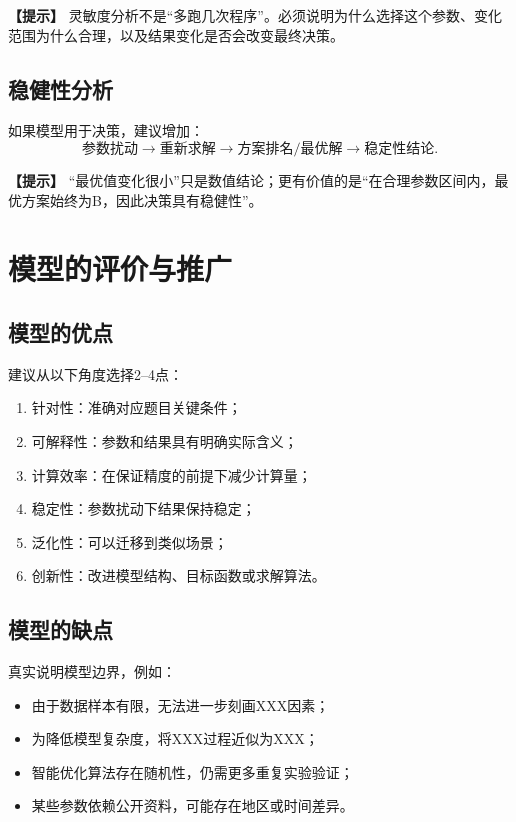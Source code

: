 \documentclass[12pt,a4paper]{article}
\newcommand{\tip}[1]{\par\noindent\textbf{【提示】} #1\par}
\begin{document}
\tip{灵敏度分析不是“多跑几次程序”。必须说明为什么选择这个参数、变化范围为什么合理，以及结果变化是否会改变最终决策。}

\subsection{稳健性分析}

如果模型用于决策，建议增加：
\[
\text{参数扰动}\rightarrow\text{重新求解}\rightarrow\text{方案排名/最优解}\rightarrow\text{稳定性结论}.
\]

\tip{“最优值变化很小”只是数值结论；更有价值的是“在合理参数区间内，最优方案始终为B，因此决策具有稳健性”。}

\section{模型的评价与推广}

\subsection{模型的优点}

建议从以下角度选择2--4点：
\begin{enumerate}
  \item 针对性：准确对应题目关键条件；
  \item 可解释性：参数和结果具有明确实际含义；
  \item 计算效率：在保证精度的前提下减少计算量；
  \item 稳定性：参数扰动下结果保持稳定；
  \item 泛化性：可以迁移到类似场景；
  \item 创新性：改进模型结构、目标函数或求解算法。
\end{enumerate}

\subsection{模型的缺点}

真实说明模型边界，例如：
\begin{itemize}
  \item 由于数据样本有限，无法进一步刻画XXX因素；
  \item 为降低模型复杂度，将XXX过程近似为XXX；
  \item 智能优化算法存在随机性，仍需更多重复实验验证；
  \item 某些参数依赖公开资料，可能存在地区或时间差异。
\end{itemize}
\end{document}
